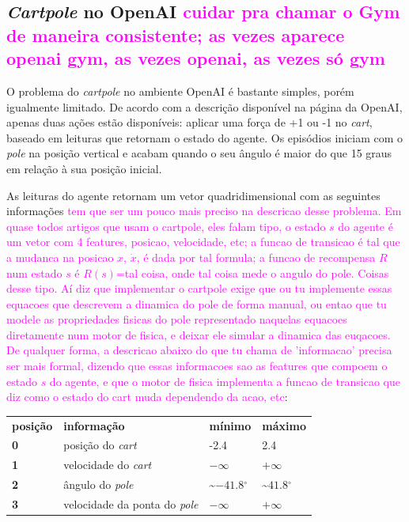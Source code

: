 \documentclass[cic,tc]{iiufrgs}
\newcommand\bruno[1]{\textcolor{magenta}{#1}}
\begin{document}
    \subsection{\textit{Cartpole} no OpenAI \bruno{cuidar pra chamar o Gym de maneira consistente; as vezes aparece openai gym, as vezes openai, as vezes só gym}}
    O problema do \textit{cartpole} no ambiente OpenAI é bastante simples, porém igualmente limitado. De acordo com a descrição
    disponível na página da OpenAI, apenas duas ações estão disponíveis: aplicar uma força de +1 ou -1 no \textit{cart}, baseado
    em leituras que retornam o estado do agente. Os episódios iniciam com o \textit{pole} na posição vertical e acabam quando
    o seu ângulo é maior do que 15 graus em relação à sua posição inicial. \par
    As leituras do agente retornam um vetor quadridimensional com as seguintes informações \bruno{tem que ser um pouco mais preciso na descricao desse problema. Em quase todos artigos que usam o cartpole, eles falam tipo, o estado $s$ do agente é um vetor com 4 features, posicao, velocidade, etc; a funcao de transicao é tal que a mudanca na posicao $x$, $\dot{x}$, é dada por tal formula; a funcao de recompensa $R$ num estado $s$ é $R(s)$=tal coisa, onde tal coisa mede o angulo do pole. Coisas desse tipo. Aí diz que implementar o cartpole exige que ou tu implemente essas equacoes que descrevem a dinamica do pole de forma manual, ou entao que tu modele as propriedades fisicas do pole representado naquelas equacoes diretamente num motor de fisica, e deixar ele simular a dinamica das euqacoes. De qualquer forma, a descricao abaixo do que tu chama de 'informacao' precisa ser mais formal, dizendo que essas informacoes sao as features que compoem o estado $s$ do agente, e que o motor de fisica implementa a funcao de transicao que diz como o estado do cart muda dependendo da acao, etc}: \\
    \begin{center}
      \begin{tabular}{llll}
      \textbf{posição} & \textbf{informação} & \textbf{mínimo} & \textbf{máximo} \\
      \textbf{0} & posição do \textit{cart} & -2.4 & 2.4 \\
      \textbf{1} & velocidade do \textit{cart} & $-\infty$ & $+\infty$ \\
      \textbf{2} & ângulo do \textit{pole} & \textasciitilde$-41.8{^\circ}$ & \textasciitilde$41.8{^\circ}$ \\
      \textbf{3} & velocidade da ponta do \textit{pole} &  $-\infty$ & $+\infty$ \\
      \end{tabular}
    \end{center}
    
\end{document}
